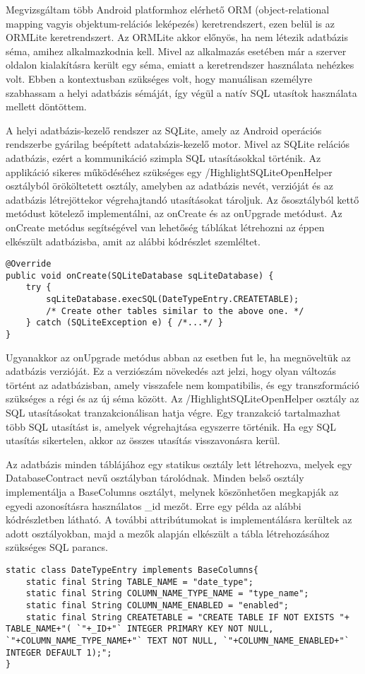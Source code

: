 Megvizsgáltam több Android platformhoz elérhető ORM (object-relational mapping vagyis objektum-relációs leképezés) keretrendszert, ezen belül is az ORMLite keretrendszert. 
Az ORMLite akkor előnyös, ha nem létezik adatbázis séma, amihez alkalmazkodnia kell.
Mivel az alkalmazás esetében már a szerver oldalon kialakításra került egy séma, emiatt a keretrendszer használata nehézkes volt.
Ebben a kontextusban szükséges volt, hogy manuálisan személyre szabhassam a helyi adatbázis sémáját, így végül a natív SQL utasítok használata mellett döntöttem.

A helyi adatbázis-kezelő rendszer az SQLite, amely az Android operációs rendszerbe gyárilag beépített adatabázis-kezelő motor.
Mivel az SQLite relációs adatbázis, ezért a kommunikáció szimpla SQL utasításokkal történik.
Az applikáció sikeres működéséhez szükséges egy /Highlight{SQLiteOpenHelper} osztályból örököltetett osztály, amelyben az adatbázis nevét, verzióját és az adatbázis létrejöttekor végrehajtandó utasításokat tároljuk.
Az ősosztályból kettő metódust kötelező implementálni, az onCreate és az onUpgrade metódust.
Az onCreate metódus segítségével van lehetőség táblákat létrehozni az éppen elkészült adatbázisba, amit az alábbi kódrészlet szemléltet.
\begin{lstlisting}
@Override
public void onCreate(SQLiteDatabase sqLiteDatabase) {
	try {
		sqLiteDatabase.execSQL(DateTypeEntry.CREATETABLE);
		/* Create other tables similar to the above one. */
	} catch (SQLiteException e) { /*...*/ }
}
\end{lstlisting}
Ugyanakkor az onUpgrade metódus abban az esetben fut le, ha megnöveltük az adatbázis verzióját.
Ez a verziószám növekedés azt jelzi, hogy olyan változás történt az adatbázisban, amely visszafele nem kompatibilis, és egy transzformáció szükséges a régi és az új séma között.
Az /Highlight{SQLiteOpenHelper} osztály az SQL utasításokat tranzakcionálisan hatja végre.
Egy tranzakció tartalmazhat több SQL utasítást is, amelyek végrehajtása egyszerre történik.
Ha egy SQL utasítás sikertelen, akkor az összes utasítás visszavonásra kerül.

Az adatbázis minden táblájához egy statikus osztály lett létrehozva, melyek egy DatabaseContract nevű osztályban tárolódnak.
Minden belső osztály implementálja a BaseColumns osztályt, melynek köszönhetően megkapják az egyedi azonosításra használatos  \_id mezőt.
Erre egy példa az alábbi kódrészletben látható.
A további attribútumokat is implementálásra kerültek az adott osztályokban, majd a mezők alapján elkészült a tábla létrehozásához szükséges SQL parancs.
\begin{lstlisting}
static class DateTypeEntry implements BaseColumns{
	static final String TABLE_NAME = "date_type";
	static final String COLUMN_NAME_TYPE_NAME = "type_name";
	static final String COLUMN_NAME_ENABLED = "enabled";
	static final String CREATETABLE = "CREATE TABLE IF NOT EXISTS "+ TABLE_NAME+"( `"+_ID+"` INTEGER PRIMARY KEY NOT NULL, `"+COLUMN_NAME_TYPE_NAME+"` TEXT NOT NULL, `"+COLUMN_NAME_ENABLED+"` INTEGER DEFAULT 1);";
}
\end{lstlisting}

